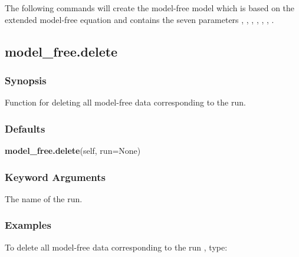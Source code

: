 
 The following commands will create the model-free model  which is based on the extended model-free equation and contains the seven parameters , , , , , , . 
  



  

 \newpage 

 \subsection{model\_free.delete} 

  
 \subsubsection{Synopsis} 

 Function for deleting all model-free data corresponding to the run. 
  

  
 \subsubsection{Defaults} 

 \textsf{\textbf{model\_free.delete}(self, run=None)} 

  
 \subsubsection{Keyword Arguments} 

   The name of the run.  

  

  
 \subsubsection{Examples} 

 To delete all model-free data corresponding to the run , type: 
  


